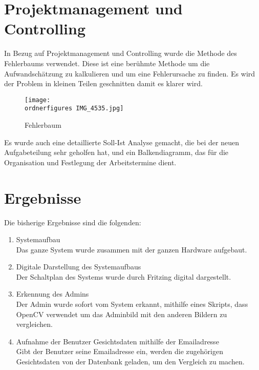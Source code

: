 	\section{Projektmanagement und Controlling}
	In Bezug auf Projektmanagement und Controlling wurde die Methode des Fehlerbaums verwendet. Diese ist eine ber{\"u}hmte Methode um die Aufwandsch{\"a}tzung zu kalkulieren und um eine Fehlerursache zu finden. Es wird der Problem in kleinen Teilen geschnitten damit es klarer wird. 
	\begin{figure}		\texttt{[image: \\ordnerfigures IMG\_4535.jpg]}
		\caption{Fehlerbaum}
	\end{figure}
	Es wurde auch eine detaillierte Soll-Ist Analyse gemacht, die bei der neuen Aufgabeteilung sehr geholfen hat, und ein Balkendiagramm, das f{\"u}r die Organisation und Festlegung der Arbeitstermine dient.
	\section{Ergebnisse}
	Die bisherige Ergebnisse sind die folgenden:\\
	\begin{enumerate}
		\item Systemaufbau \\
		Das ganze System wurde zusammen mit der ganzen Hardware aufgebaut.
		\item Digitale Darstellung des Systemaufbaus\\
		Der Schaltplan des Systems wurde durch Fritzing digital dargestellt.
		\item Erkennung des Admins \\
		Der Admin wurde sofort vom System erkannt, mithilfe eines Skripts, dass OpenCV verwendet um das Adminbild mit den anderen Bildern zu vergleichen.
		\item Aufnahme der Benutzer Gesichtsdaten mithilfe der Emailadresse\\
		Gibt der Benutzer seine Emailadresse ein, werden die zugehörigen Gesichtsdaten von der Datenbank geladen, um den Vergleich zu machen.
	\end{enumerate}
	
	
